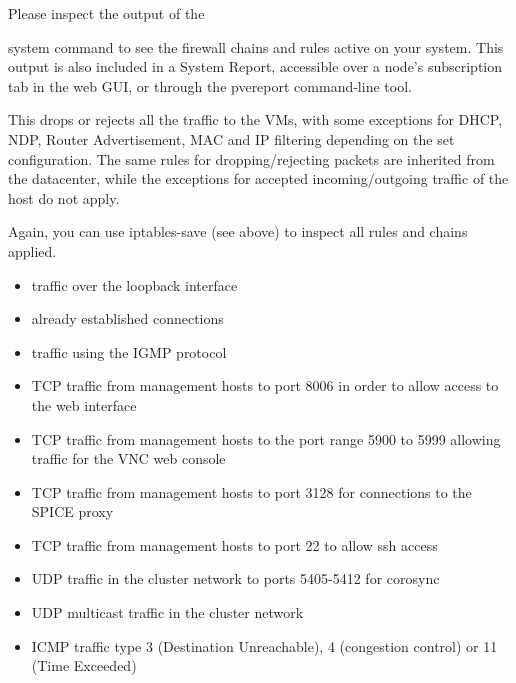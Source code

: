 Please inspect the output of the

system command to see the firewall chains and rules active on your system. This output is also included in a System Report, accessible over a node’s subscription tab in the web GUI, or through the pvereport command-line tool.

This drops or rejects all the traffic to the VMs, with some exceptions for DHCP, NDP, Router Advertisement, MAC and IP filtering depending on the set configuration. The same rules for dropping/rejecting packets are inherited from the datacenter, while the exceptions for accepted incoming/outgoing traffic of the host do not apply.

Again, you can use iptables-save (see above) to inspect all rules and chains applied.

\begin{itemize}[leftmargin=2cm]

	\item traffic over the loopback interface

	\item already established connections

	\item traffic using the IGMP protocol

	\item TCP traffic from management hosts to port 8006 in order to allow access to the web interface

	\item TCP traffic from management hosts to the port range 5900 to 5999 allowing traffic for the VNC web console

	\item TCP traffic from management hosts to port 3128 for connections to the SPICE proxy

	\item TCP traffic from management hosts to port 22 to allow ssh access

	\item UDP traffic in the cluster network to ports 5405-5412 for corosync

	\item UDP multicast traffic in the cluster network

	\item ICMP traffic type 3 (Destination Unreachable), 4 (congestion control) or 11 (Time Exceeded)

\end{itemize}

